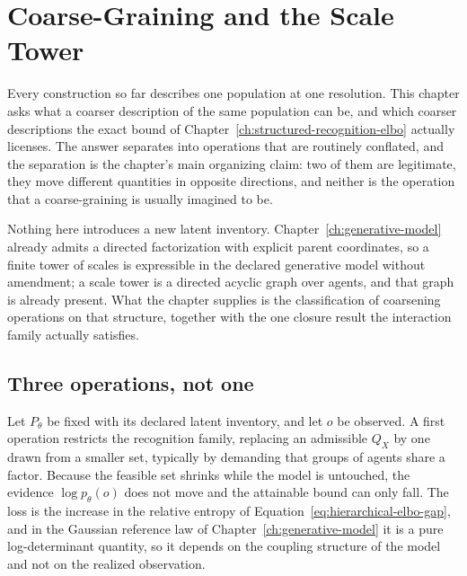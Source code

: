 \chapter{Coarse-Graining and the Scale Tower}
\label{ch:coarse-graining}

Every construction so far describes one population at one resolution. This chapter asks what a coarser description of the same population can be, and which coarser descriptions the exact bound of Chapter~\ref{ch:structured-recognition-elbo} actually licenses. The answer separates into operations that are routinely conflated, and the separation is the chapter's main organizing claim: two of them are legitimate, they move different quantities in opposite directions, and neither is the operation that a coarse-graining is usually imagined to be.

Nothing here introduces a new latent inventory. Chapter~\ref{ch:generative-model} already admits a directed factorization with explicit parent coordinates, so a finite tower of scales is expressible in the declared generative model without amendment; a scale tower is a directed acyclic graph over agents, and that graph is already present. What the chapter supplies is the classification of coarsening operations on that structure, together with the one closure result the interaction family actually satisfies.

\section{Three operations, not one}

Let \(P_\theta\) be fixed with its declared latent inventory, and let \(o\) be observed. A first operation restricts the recognition family, replacing an admissible \(Q_X\) by one drawn from a smaller set, typically by demanding that groups of agents share a factor. Because the feasible set shrinks while the model is untouched, the evidence \(\log p_\theta(o)\) does not move and the attainable bound can only fall. The loss is the increase in the relative entropy of Equation~\eqref{eq:hierarchical-elbo-gap}, and in the Gaussian reference law of Chapter~\ref{ch:generative-model} it is a pure log-determinant quantity, so it depends on the coupling structure of the model and not on the realized observation.

